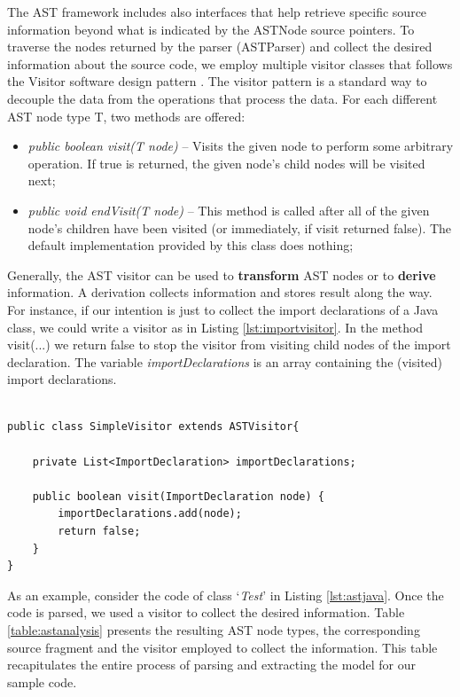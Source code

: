   
The AST framework includes also interfaces that help retrieve specific source information beyond what is indicated by the ASTNode source pointers. To traverse the nodes returned by the parser (ASTParser) and collect the desired information about the source code, we employ multiple visitor classes that follows the Visitor software design pattern \cite{gamma1994design}. 
The visitor pattern is a standard way to decouple the data from the operations that process the data.
For each different AST node type T, two methods are offered:

\begin{itemize}

\item  \textit{public boolean visit(T node)} -- Visits the given node to perform some arbitrary operation. If true is returned, the given node's child nodes will be visited next;
\item  \textit{public void endVisit(T node)} --  This method is called after all of the given node's children have been visited (or immediately, if visit returned false). The default implementation provided by this class does nothing;
\end{itemize}

Generally, the AST visitor can be used to \textbf{transform} AST nodes or to \textbf{derive} information. A derivation collects information and stores result along the way. For instance, if our intention is just to collect the import declarations of a Java class, we could write a visitor as in Listing \ref{lst:importvisitor}. In the method visit(...) we return false to stop the visitor from visiting child nodes of the import declaration. The variable \textit{importDeclarations} is an array containing the (visited) import declarations. 

\begin{lstlisting}[style=java, caption=A visitor for import declarations in Java source code, label=lst:importvisitor]

public class SimpleVisitor extends ASTVisitor{

	private List<ImportDeclaration> importDeclarations;

	public boolean visit(ImportDeclaration node) {
	    importDeclarations.add(node);
	    return false;
	}
}
\end{lstlisting}

As an example, consider the code of class `\textit{Test}' in Listing \ref{lst:astjava}. Once the code is parsed, we used a visitor to collect the desired information. Table \ref{table:astanalysis} presents the resulting AST node types, the corresponding source fragment and the visitor employed to collect the information. This table recapitulates the entire process of parsing and extracting the model for our sample code. 


